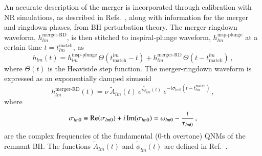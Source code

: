 \documentclass[twocolumn,
               prd,
               aps,
               superscriptaddress,
               tightenlines,
               nofootinbib,
               eqsecnum,
               amsfonts,
               amsmath,
               longbibliography]{revtex4-1}
\newcommand{\ag}[1]{{\textcolor{Maroon}{{#1}} }}
\begin{document}
%
An accurate description of the merger is incorporated through calibration with
NR simulations, as described in Refs.~\cite{Bohe:2016gbl,Cotesta:2018fcv}, along with
information for the merger and ringdown phases, from BH perturbation theory.
The merger-ringdown waveform, $h_{l m}^\textrm{merger-RD}$, is then stitched to
inspiral-plunge waveform, $h_{l m}^\textrm{insp-plunge}$ at a certain time $t = t^{\textrm{match}}_{l m}$, as
%
\begin{equation}
h_{l m}(t) =
h_{l m}^\textrm{insp-plunge}\, \Theta(t_\textrm{match}^{l m} - t)
+ h_{l m}^\textrm{merger-RD}\,\Theta(t-t_\textrm{match}^{l m})\,,
\end{equation}
%
where $\Theta(t)$ is the Heaviside step function. 
%
The merger-ringdown waveform is expressed as an exponentially damped
sinusoid~\cite{Bohe:2016gbl,Cotesta:2018fcv} 
%
\begin{equation}
\label{RD}
h_{l m}^{\textrm{merger-RD}}(t) = \nu \ \tilde{A}_{l m}(t)\ e^{i \tilde{\phi}_{l m}(t)} \ e^{-i \sigma_{l m 0}(t-t^{\textrm{match}}_{l m})}\,,
\end{equation}
%
where
%
\begin{align}
\sigma_{l m 0} \equiv {\rm Re}(\sigma_{l m 0}) + i \, {\rm Im}(\sigma_{l m 0})
= \omega_{l m 0} - \frac{i}{\tau_{l m 0}}\,,
\end{align}
%
are the complex frequencies of the fundamental ($0$-th overtone) QNMs of the remnant BH.
%
%
The functions $\tilde{A}_{l m}(t)$ and $\tilde{\phi}_{l m}(t)$ are defined
in Ref.~\cite{Bohe:2016gbl,Cotesta:2018fcv}.
\end{document}
